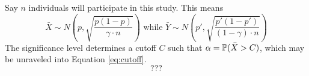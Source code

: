 Say $n$ individuals will participate in this study. This means
\[
    \bar X \sim N\left(p, \sqrt{\frac{p(1-p)}{\gamma \cdot n}}\right) \text{ while } \bar Y \sim N\left(p', \sqrt{\frac{p'(1-p')}{(1-\gamma) \cdot n}}\right)
\]
The significance level determines a cutoff $C$ such that $\alpha = \mathbb{P}(\bar X > C)$, which may be unraveled into Equation \ref{eq:cutoff}.
\begin{equation} \label{eq:cutoff}
    ???
\end{equation}

